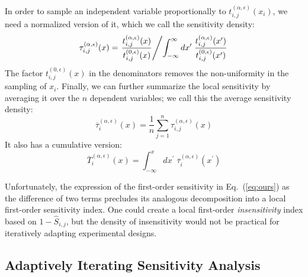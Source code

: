 \documentclass[12pt]{article}
\begin{document}
In order to sample an independent variable proportionally to $t_{i,j}^{(\alpha,\epsilon)}(x_i)$, we need a normalized version of it, which we call the sensitivity density:
\begin{equation}
    \tau_{i,j}^{(\alpha,\epsilon)}(x) = \left. \frac{t_{i,j}^{(\alpha,\epsilon)}(x)}{t_{i,j}^{(0,\epsilon)}(x)} \middle/ \int_{-\infty}^{\infty} d x^\prime \; \frac{t_{i,j}^{(\alpha,\epsilon)}(x^\prime)}{t_{i,j}^{(0,\epsilon)}(x^\prime)} \right. \label{eq:taux}
\end{equation}
The factor $t_{i,j}^{(0,\epsilon)}(x)$ in the denominators removes the non-uniformity in the sampling of $x_i$. Finally, we can further summarize the local sensitivity by averaging it over the $n$ dependent variables; we call this the average sensitivity density:
\begin{equation}
    \overline{\tau}_i^{(\alpha,\epsilon)}(x) = \frac{1}{n} \sum_{j=1}^n \tau_{i,j}^{(\alpha,\epsilon)}(x) \label{eq:taubar}
\end{equation}
It also has a cumulative version:
\begin{equation}
    \overline{T}_i^{(\alpha,\epsilon)}(x) = \int_{-\infty}^x d x^\prime \; \overline{\tau}_i^{(\alpha,\epsilon)}(x^\prime) \label{eq:tbar}
\end{equation}

Unfortunately, the expression of the first-order sensitivity in Eq.~(\ref{eq:ours}) as the difference of two terms precludes its analogous decomposition into a local first-order sensitivity index. One could create a local first-order \textit{insensitivity} index based on $1 - \hat{S}_{i,j}$, but the density of insensitivity would not be practical for iteratively adapting experimental designs.

\subsection{Adaptively Iterating Sensitivity Analysis}
\end{document}
